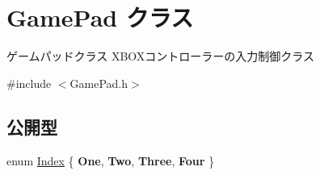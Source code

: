 \hypertarget{class_game_pad}{}\section{Game\+Pad クラス}
\label{class_game_pad}


ゲームパッドクラス  X\+B\+O\+Xコントローラーの入力制御クラス  




{\ttfamily \#include $<$Game\+Pad.\+h$>$}

\subsection*{公開型}
\begin{DoxyCompactItemize}
\item 
enum \hyperlink{class_game_pad_a94753052e481fcc532efd78d0dc92250}{Index} \{ {\bfseries One}, 
{\bfseries Two}, 
{\bfseries Three}, 
{\bfseries Four}
 \}
\end{DoxyCompactItemize}
